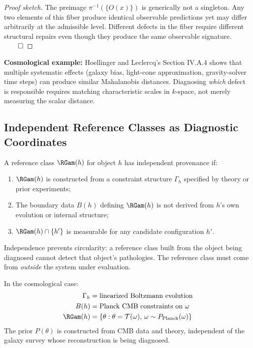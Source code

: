 \begin{proof}[Proof sketch]
The preimage $\pi^{-1}(\{O(x)\})$ is generically not a singleton. Any two elements of this fiber produce identical observable predictions yet may differ arbitrarily at the admissible level. Different defects in the fiber require different structural repairs even though they produce the same observable signature. $\qed$
\end{proof}

\textbf{Cosmological example:} Hoellinger and Leclercq's Section IV.A.4 shows that multiple systematic effects (galaxy bias, light-cone approximation, gravity-solver time steps) can produce similar Mahalanobis distances. Diagnosing \emph{which} defect is responsible requires matching characteristic scales in $k$-space, not merely measuring the scalar distance.


\subsection{Independent Reference Classes as Diagnostic Coordinates}

\begin{definition}
A reference class $\RGam(h)$ for object $h$ has independent provenance if:
\begin{enumerate}
\item $\RGam(h)$ is constructed from a constraint structure $\Gamma_h$ specified by theory or prior experiments;
\item The boundary data $B(h)$ defining $\RGam(h)$ is not derived from $h$'s own evolution or internal structure;
\item $\RGam(h) \cap \{h'\}$ is measurable for any candidate configuration $h'$.
\end{enumerate}
\end{definition}

Independence prevents circularity: a reference class built from the object being diagnosed cannot detect that object's pathologies. The reference class must come from \emph{outside} the system under evaluation.

\begin{example}
In the cosmological case:
\begin{align*}
\Gamma_h &= \text{linearized Boltzmann evolution} \\
B(h) &= \text{Planck CMB constraints on } \omega \\
\RGam(h) &= \{\theta : \theta = \mathcal{T}(\omega), \, \omega \sim P_{\mathrm{Planck}}(\omega)\}
\end{align*}
The prior $P(\theta)$ is constructed from CMB data and theory, independent of the galaxy survey whose reconstruction is being diagnosed.
\end{example}


